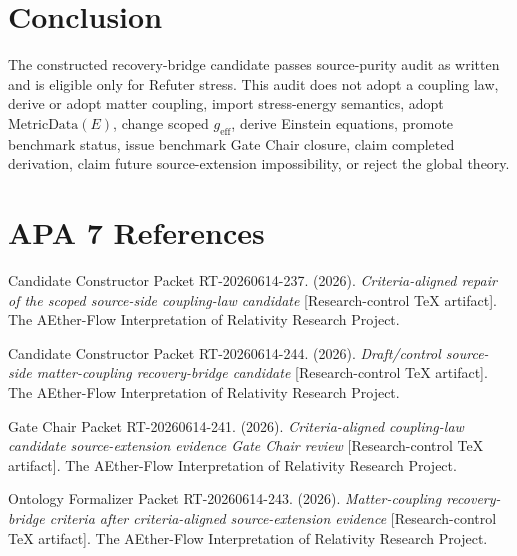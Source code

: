 \documentclass[11pt]{article}
\newcommand{\geff}{g_{\mathrm{eff}}}
\newcommand{\MetricData}{\mathrm{MetricData}}
\begin{document}
\section{Conclusion}

The constructed recovery-bridge candidate passes source-purity audit as
written and is eligible only for Refuter stress. This audit does not adopt a
coupling law, derive or adopt matter coupling, import stress-energy semantics,
adopt \(\MetricData(E)\), change scoped \(\geff\), derive Einstein equations,
promote benchmark status, issue benchmark Gate Chair closure, claim completed
derivation, claim future source-extension impossibility, or reject the global
theory.

\section{APA 7 References}

Candidate Constructor Packet RT-20260614-237. (2026). \emph{Criteria-aligned
repair of the scoped source-side coupling-law candidate} [Research-control
TeX artifact]. The AEther-Flow Interpretation of Relativity Research Project.

Candidate Constructor Packet RT-20260614-244. (2026). \emph{Draft/control
source-side matter-coupling recovery-bridge candidate} [Research-control TeX
artifact]. The AEther-Flow Interpretation of Relativity Research Project.

Gate Chair Packet RT-20260614-241. (2026). \emph{Criteria-aligned
coupling-law candidate source-extension evidence Gate Chair review}
[Research-control TeX artifact]. The AEther-Flow Interpretation of Relativity
Research Project.

Ontology Formalizer Packet RT-20260614-243. (2026). \emph{Matter-coupling
recovery-bridge criteria after criteria-aligned source-extension evidence}
[Research-control TeX artifact]. The AEther-Flow Interpretation of Relativity
Research Project.
\end{document}
